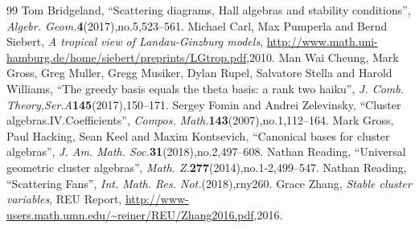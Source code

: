 \documentclass[10pt,a4paper]{amsart}
\theoremstyle{definition}
\begin{document}
\begin{thebibliography}{99}
 Tom Bridgeland, ``Scattering diagrams, Hall algebras and stability conditions'', \emph{Algebr. Geom.}\textbf{4}(2017),no.5,523--561.
 Michael Carl, Max Pumperla and Bernd Siebert, \emph{A tropical view of Landau-Ginzburg models}, \url{http://www.math.uni-hamburg.de/home/siebert/preprints/LGtrop.pdf},2010.
 Man Wai Cheung, Mark Gross, Greg Muller, Gregg Musiker, Dylan Rupel, Salvatore Stella and Harold Williams, ``The greedy basis equals the theta basis: a rank two haiku'', \emph{J. Comb. Theory,Ser.A}\textbf{145}(2017),150--171.
 Sergey Fomin and Andrei Zelevinsky, ``Cluster algebras.IV.Coefficients'', \emph{Compos. Math.}\textbf{143}(2007),no.1,112--164.
 Mark Gross, Paul Hacking, Sean Keel and Maxim Kontsevich, ``Canonical bases for cluster algebras'', \emph{J. Am. Math. Soc.}\textbf{31}(2018),no.2,497--608.
 Nathan Reading, ``Universal geometric cluster algebras'', \emph{Math. Z.}\textbf{277}(2014),no.1-2,499--547.
 Nathan Reading, ``Scattering Fans'', \emph{Int. Math. Res. Not.}(2018),rny260.
 Grace Zhang, \emph{Stable cluster variables}, REU Report, \url{http://www-users.math.umn.edu/~reiner/REU/Zhang2016.pdf},2016.
\end{thebibliography}
\end{document}
